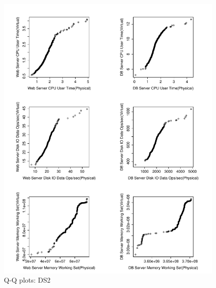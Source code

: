 

\begin{figure}[thb]
	\centering
	\includegraphics[width=0.9\columnwidth]{figures/qqplots_DS2.pdf}
	\caption{Q-Q plots: DS2}
	\label{fig:Results Table}
\end{figure}



